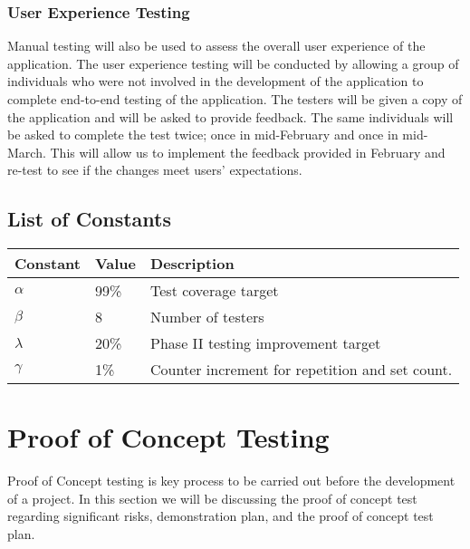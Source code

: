 \subsubsection{User Experience Testing} 
Manual testing will also be used to assess the overall user experience of the application. The user experience testing will be conducted by allowing a group of individuals who were not involved in the development of the application to complete end-to-end testing of the application. The testers will be given a copy of the application and will be asked to provide feedback. The same individuals will be asked to complete the test twice; once in mid-February and once in mid-March. This will allow us to implement the feedback provided in February and re-test to see if the changes meet users' expectations. 

\subsection{List of Constants} 
\begingroup
\begin{center}
\begin{tabular}{ | p{3cm} | p{3cm} | p{5cm} |} 
    \hline
    \textbf{Constant} & \textbf{Value} & \textbf{Description}\\
    \hline
    $\alpha$ & 99\% & Test coverage target \\
    \hline
    $\beta$ & 8 & Number of testers\\
    \hline
    $\lambda$ & 20\% & Phase II testing improvement target\\
    \hline
     $\gamma$ & 1\% & Counter increment for repetition and set count.\\
    \hline
\end{tabular}
\end{center}
\endgroup

\section{Proof of Concept Testing}
Proof of Concept testing is key process to be carried out before the development of a project. In this section we will be discussing the proof of concept test regarding significant risks, demonstration plan, and the proof of concept test plan.
